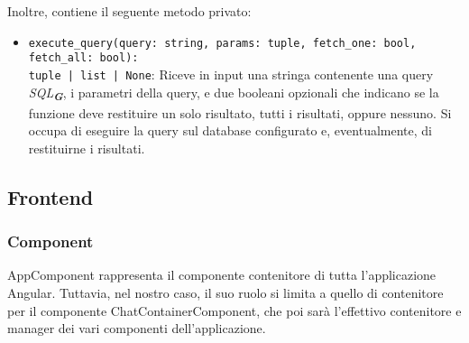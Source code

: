 Inoltre, contiene il seguente metodo privato:
\begin{itemize}
    \item \texttt{execute\_query(query: string, params: tuple, fetch\_one: bool, fetch\_all: bool):\\ tuple | list | None}: Riceve in input una stringa contenente una query \emph{SQL}\textsubscript{\textbf{\textit{G}}}, i parametri della query, e due booleani opzionali che indicano se la funzione deve restituire un solo risultato, tutti i risultati, oppure nessuno. Si occupa di eseguire la query sul database configurato e, eventualmente, di restituirne i risultati.
\end{itemize}

\newpage



\subsection{Frontend}
\label{sec:frontend}

\subsubsection{Component}
\label{sec:component}

\label{sec:app_component}
AppComponent rappresenta il componente contenitore di tutta l'applicazione Angular. Tuttavia, nel nostro caso, il suo ruolo si limita a quello di contenitore per il componente ChatContainerComponent, che poi sarà l'effettivo contenitore e manager dei vari componenti dell'applicazione.

